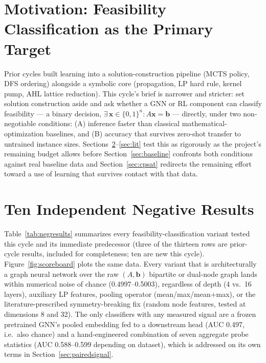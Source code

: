 \documentclass[12pt]{article}
\begin{document}
\begin{abstract}
(\texttt{linearization\_level=2}, \texttt{PORTFOLIO\_SEARCH}, \texttt{LP\_SEARCH}) all matched or underperformed the default, closing off that direction until a parameter with genuine variance is found.
\end{abstract}

\section{Motivation: Feasibility Classification as the Primary Target}

Prior cycles built learning into a solution-construction pipeline (MCTS policy, DFS ordering) alongside a symbolic core (propagation, LP hard rule, kernel pump, AHL lattice reduction). This cycle's brief is narrower and stricter: set solution construction aside and ask whether a GNN or RL component can classify feasibility --- a binary decision, $\exists\, \mathbf{x}\in\{0,1\}^n: A\mathbf{x}=\mathbf{b}$ --- directly, under two non-negotiable conditions: (A) inference faster than classical mathematical-optimization baselines, and (B) accuracy that survives zero-shot transfer to untrained instance sizes. Sections~\ref{sec:tenways}--\ref{sec:lit} test this as rigorously as the project's remaining budget allows before Section~\ref{sec:baseline} confronts both conditions against real baseline data and Section~\ref{sec:cpsat} redirects the remaining effort toward a use of learning that survives contact with that data.

\section{Ten Independent Negative Results}
\label{sec:tenways}

Table~\ref{tab:negresults} summarizes every feasibility-classification variant tested this cycle and its immediate predecessor (three of the thirteen rows are prior-cycle results, included for completeness; ten are new this cycle). Figure~\ref{fig:scoreboard} plots the same data. Every variant that is architecturally a graph neural network over the raw $(A,\mathbf{b})$ bipartite or dual-node graph lands within numerical noise of chance (0.4997--0.5003), regardless of depth (4 vs.\ 16 layers), auxiliary LP features, pooling operator (mean/max/mean+max), or the literature-prescribed symmetry-breaking fix (random node features, tested at dimensions 8 and 32). The only classifiers with any measured signal are a frozen pretrained GNN's pooled embedding fed to a downstream head (AUC 0.497, i.e.\ also chance) and a hand-engineered combination of seven aggregate probe statistics (AUC 0.588--0.599 depending on dataset), which is addressed on its own terms in Section~\ref{sec:pairedsignal}.
\end{document}
